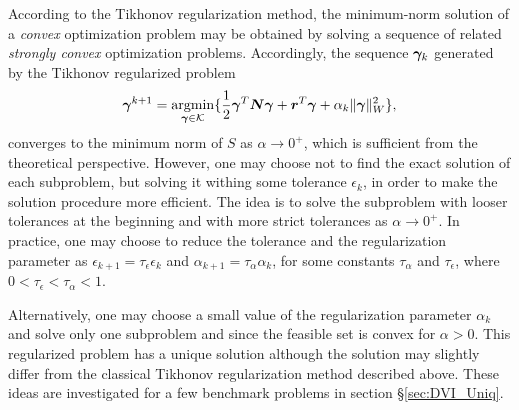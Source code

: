 According to the Tikhonov regularization method, the minimum-norm solution of a \textit{convex} optimization problem may be obtained by solving a sequence of related \textit{strongly convex} optimization problems. Accordingly, the sequence ${\boldsymbol{\gamma}_k}$ generated by the Tikhonov regularized problem
\begin{equation}
 \boldsymbol{\gamma}^{k+1} = \underset{\boldsymbol{\gamma} \in {\mathcal{K}} }{\mathrm{argmin}} \{\frac{1}{2}\boldsymbol{\gamma}^T \boldsymbol{N} \boldsymbol{\gamma}+\boldsymbol{r}^T \boldsymbol{\gamma} + \alpha_k \|\boldsymbol{\gamma}\|^2_W   \},
\end{equation}
 converges to the minimum norm of $S$ as $\alpha \to 0^+$, which is sufficient from the theoretical perspective. However, one may choose not to find the exact solution of each subproblem, but solving it withing some tolerance $\epsilon_k$, in order to make the solution procedure more efficient. The idea is to solve the subproblem with looser tolerances at the beginning and with more strict tolerances as $\alpha \to 0^+$. In practice, one may choose to reduce the tolerance and the regularization parameter as $\epsilon_{k+1}=\tau_{\epsilon} \epsilon_{k}$ and $\alpha_{k+1}=\tau_{\alpha} \alpha_{k}$, for some constants $\tau_{\alpha}$ and $\tau_{\epsilon}$, where $0<\tau_{\epsilon}<\tau_{\alpha}<1$. 
 
 Alternatively, one may choose a small value of the regularization parameter $\alpha_k$ and solve only one subproblem and since the feasible set is convex for $\alpha>0$. This regularized problem has a unique solution although the solution may slightly differ from the classical Tikhonov regularization method described above. These ideas are investigated for a few benchmark problems in section \S\ref{sec:DVI_Uniq}.

